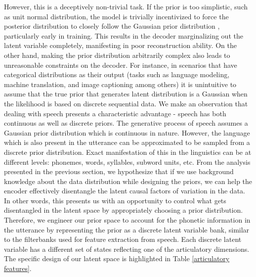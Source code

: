 However, this is a deceptively non-trivial task. If the prior is too simplistic, such as unit normal distribution, the model is trivially incentivized to force the posterior distribution to closely follow the Gaussian prior distribution \citep{lossy_vae}, particularly early in training. This results in the decoder marginalizing out the latent variable completely, manifesting in poor reconstruction ability. On the other hand, making the prior distribution arbitrarily complex also leads to unreasonable constraints on the decoder. For instance, in scenarios that have categorical distributions as their output (tasks such as language modeling, machine translation, and image captioning among others) it is unintuitive to assume that the true prior that generates latent distribution is a Gaussian when the likelihood is based on discrete sequential data. We make an observation that dealing with speech presents a characteristic advantage - speech has both continuous as well as discrete priors. The generative process of speech assumes a Gaussian prior distribution which is continuous in nature. However, the language which is also present in the utterance can be approximated to be sampled from a discrete prior distribution. Exact manifestation of this in the linguistics can be at different levels: phonemes, words, syllables, subword units, etc. From the analysis presented in the previous section, we hypothesize that if we use background knowledge about the data distribution while designing the priors, we can help the encoder effectively disentangle the latent causal factors of variation in the data. In other words, this presents us with an opportunity to control what gets disentangled in the latent space by appropriately choosing a prior distribution. Therefore, we engineer our prior space to account for the phonetic information in the utterance by representing the prior as a discrete latent variable bank, similar to the filterbanks used for feature extraction from speech. Each discrete latent variable has a different set of states reflecting one of the articulatory dimensions. The specific design of our latent space is highlighted in Table \ref{articulatory features}.


